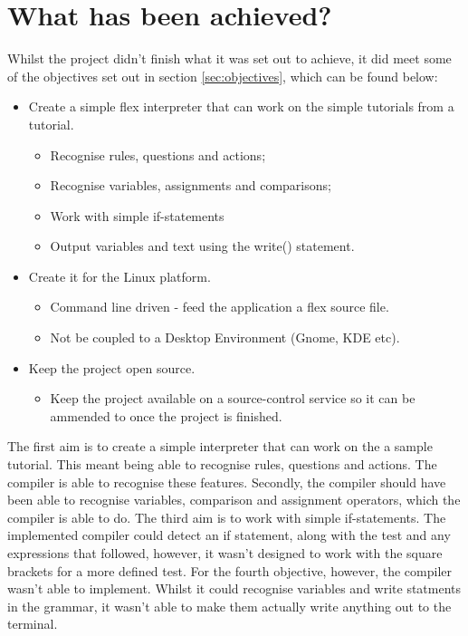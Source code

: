 \documentclass[12pt]{report}
\begin{document}
\section{What has been achieved?}\label{sec:con:achieved}
Whilst the project didn't finish what it was set out to achieve, it did meet some of the objectives set out in section \ref{sec:objectives}, which can be found below:\\
\begin{itemize}
\item Create a simple flex interpreter that can work on the simple tutorials from a tutorial.
	\begin{itemize}
	\item Recognise rules, questions and actions;
	\item Recognise variables, assignments and comparisons;
	\item Work with simple if-statements
	\item Output variables and text using the write() statement.
	\end{itemize}
\item Create it for the Linux platform.
	\begin{itemize}
	\item Command line driven - feed the application a flex source file.
	\item Not be coupled to a Desktop Environment (Gnome, KDE etc).
	\end{itemize}
\item Keep the project open source.
	\begin{itemize}
	\item Keep the project available on a source-control service so it can be ammended to once the project is finished.\\
	\end{itemize}
\end{itemize}
The first aim is to create a simple interpreter that can work on the a sample tutorial.  This meant being able to recognise rules, questions and actions.  The compiler is able to recognise these features.  Secondly, the compiler should have been able to recognise variables, comparison and assignment operators, which the compiler is able to do.  The third aim is to work with simple if-statements.  The implemented compiler could detect an if statement, along with the test and any expressions that followed, however, it wasn't designed to work with the square brackets for a more defined test.  For the fourth objective, however, the compiler wasn't able to implement.  Whilst it could recognise variables and write statments in the grammar, it wasn't able to make them actually write anything out to the terminal.\\
\end{document}
